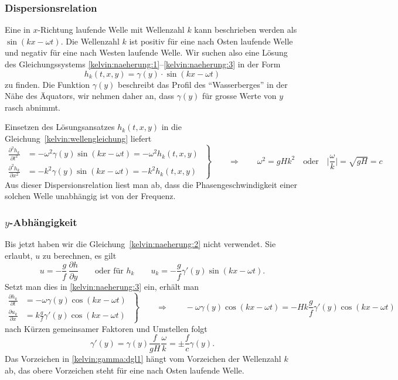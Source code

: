 \subsubsection{Dispersionsrelation}
Eine in $x$-Richtung laufende Welle mit Wellenzahl $k$ kann beschrieben werden
als
$
\sin(kx-\omega t).
$
Die Wellenzahl $k$ ist positiv für eine nach Osten laufende Welle und negativ
für eine nach Westen laufende Welle.
Wir suchen also eine Lösung des Gleichungssystems
\eqref{kelvin:naeherung:1}--\eqref{kelvin:naeherung:3}
in der Form
\[
h_k(t,x,y) = \gamma(y)\cdot \sin(kx-\omega t)
\]
zu finden.
Die Funktion $\gamma(y)$ beschreibt das Profil des ``Wasserberges'' 
in der Nähe des Äquators, wir nehmen daher an, dass $\gamma(y)$ für grosse
Werte von $y$ rasch abnimmt.

Einsetzen des Lösungsansatzes $h_k(t,x,y)$ in die
Gleichung~\eqref{kelvin:wellengleichung} liefert
\begin{equation}
\left.
\begin{aligned}
\frac{\partial^2 h_k}{\partial t^2}
&=
- \omega^2 \gamma(y) \sin(kx-\omega t)
=
-\omega^2 h_k(t,x,y)
\\
\frac{\partial^2 h_k}{\partial x^2}
&=
-
k^2
\gamma(y)
\sin (kx-\omega t)
=
-k^2 h_k(t,x,y)
\end{aligned}
\;\right\}
\qquad
\Rightarrow
\qquad
\omega^2=gHk^2
\quad\text{oder}\quad
\biggl|
\frac{\omega}{k}\biggr|
=\sqrt{gH}=c
\end{equation}
Aus dieser Dispersionsrelation
liest man ab, dass die Phasengeschwindigkeit einer solchen
Welle unabhängig ist von der Frequenz.

\subsubsection{$y$-Abhängigkeit}
Bis jetzt haben wir die Gleichung~\eqref{kelvin:naeherung:2} nicht
verwendet.
Sie erlaubt, $u$ zu berechnen, es gilt
\[
u=-\frac{g}{f}\,\frac{\partial h}{\partial y}
\qquad
\text{oder für $h_k$}
\qquad
u_k=-\frac{g}{f} \gamma'(y) \sin(kx-\omega t).
\]
Setzt man dies in \eqref{kelvin:naeherung:3} ein, erhält man
\begin{equation}
\left.
\begin{aligned}
\frac{\partial h_k}{\partial t}
&=
-\omega
\gamma(y) \cos(kx-\omega t)
\\
\frac{\partial u_k}{\partial x}
&=
k \frac{g}{f}\gamma'(y) \cos(kx-\omega t)
\end{aligned}
\;\right\}
\qquad\Rightarrow\qquad
-\omega
\gamma(y) \cos(kx-\omega t)
=
-H
k \frac{g}{f}\gamma'(y) \cos(kx-\omega t)
\end{equation}
nach Kürzen gemeinsamer Faktoren und Umstellen folgt
\begin{equation}
\gamma'(y)
=
\gamma(y) \frac{f}{gH}\frac{\omega}{k}
=
\pm
\frac{f}{c} \gamma(y).
\label{kelvin:gamma:dgl1}
\end{equation}
Das Vorzeichen in \eqref{kelvin:gamma:dgl1} hängt vom Vorzeichen der
Wellenzahl $k$ ab, das obere Vorzeichen steht für eine nach Osten
laufende Welle.

